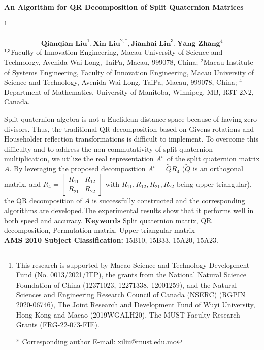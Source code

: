 \documentclass[12pt]{article}
\numberwithin{equation}{section}
\renewenvironment{abstract}{%
  \noindent\bfseries \abstractname \par%
  \normalfont
  \list{}{%
    \leftmargin=0cm%
    \rightmargin=0cm%
  }%
  \item\relax
}{%
  \endlist
}
\newcommand\blfootnote[1]{%
  \begingroup
  \renewcommand\thefootnote{}\footnote{#1}%
  \addtocounter{footnote}{-1}%
  \endgroup
}
\begin{document}
\begin{center}

{\LARGE \textbf{An Algorithm for QR Decomposition of Split Quaternion Matrices} }

\blfootnote{This research is supported by Macao Science and Technology Development Fund (No. 0013/2021/ITP), the grants from the National Natural Science Foundation of China  (12371023, 12271338, 12001259), and the Natural Sciences and Engineering Research Council of Canada (NSERC) (RGPIN 2020-06746), The Joint Research and Development Fund of Wuyi University, Hong Kong and Macao (2019WGALH20), The MUST Faculty Research Grants (FRG-22-073-FIE). \par
* Corresponding author
E-mail: xiliu@must.edu.mo
 }
\bigskip
$${\textbf{Qianqian Liu}^{1}, \textbf{Xin Liu}^{2, \ast}, \textbf{Jianhai Lin}^{3}, \textbf{Yang Zhang}^{4}}$$
\newline $^{\text{1,3}}$Faculty of Innovation Engineering, Macau University of Science and Technology, Avenida Wai Long, TaiPa, Macau, 999078, China; 
\newline $^{\text{2}}$Macau Institute of Systems Engineering, Faculty of Innovation Engineering, Macau University of Science and Technology, Avenida Wai Long, TaiPa, Macau, 999078, China;
\newline $^{\text{4}}$ Department of Mathematics, University of Manitoba, Winnipeg, MB, R3T 2N2, Canada. \\
\bigskip
\end{center}


\begin{abstract}
Split quaternion algebra is not a Euclidean distance space because of having zero divisors. Thus, the traditional QR decomposition based on Givens rotations and Householder reflection transformations is difficult to implement. To overcome this difficulty and to address the non-commutativity of split quaternion multiplication, we utilize the real representation $A^\sigma$ of the split quaternion matrix $A$. By leveraging the proposed decomposition $A^\sigma = \widetilde{Q}R_4$ ($\widetilde{Q}$ is an orthogonal matrix, and $R_4 = \begin{bmatrix} R_{11} & R_{12} \\ R_{21} & R_{22} \end{bmatrix}$ with $R_{11}, R_{12}, R_{21}, R_{22}$ being upper triangular), the QR decomposition of $A$ is successfully constructed and the corresponding algorithms are developed.The experimental results show that it performs well in both speed and accuracy.
\end{abstract}
\noindent\textbf{Keywords} Split quaternion matrix, QR decomposition, Permutation matrix, Upper triangular matrix
\\
\noindent\textbf{AMS 2010 Subject Classification:} 15B10, 15B33, 15A20, 15A23.
\end{document}
